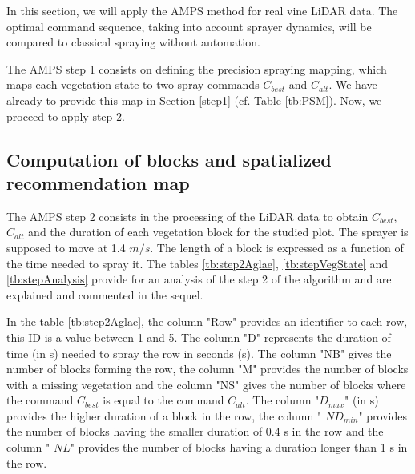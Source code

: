 \documentclass[preprint,3p,times,twocolumn]{elsarticle}
\begin{document}
In this section, we will apply the AMPS method for real vine LiDAR data. The optimal command sequence, taking into account sprayer dynamics, will be compared to classical spraying without automation.

The AMPS step 1 consists on defining the precision spraying mapping, which maps each vegetation state to two spray commands $C_{best}$ and $C_{alt}$. We have already to provide this map in Section \ref{step1} (cf. Table \ref{tb:PSM}). Now, we proceed to apply step 2.

\subsection{Computation of blocks and spatialized recommendation map}

The AMPS step 2 consists in the processing of the LiDAR data to obtain $C_{best}$, $C_{alt}$ and the duration of each vegetation block for the studied plot. The sprayer is supposed to move at 1.4 $m/s$. The length of a block is expressed as a function of the time needed to spray it. The tables \ref{tb:step2Aglae}, \ref{tb:stepVegState} and \ref{tb:stepAnalysis} provide for an analysis of the step 2 of the algorithm and are explained and commented in the sequel.

In the table \ref{tb:step2Aglae}, the column "Row" provides an identifier to each row, this ID is a value between 1 and 5. The column "D" represents the duration of time (in s) needed to spray the row in seconds (s). The column "NB" gives the number of blocks forming the row, the column "M" provides the number of blocks with a missing vegetation and the column "NS" gives the number of blocks where the command $C_{best}$ is equal to the command $C_{alt}$. The column "$D_{max}$" (in s) provides the higher duration of a block in the row, the column " $ND_{min}$" provides the number of blocks having the smaller duration of 0.4 s in the row and the column " $NL$" provides the number of blocks having a duration longer than 1 s in the row.
\end{document}
